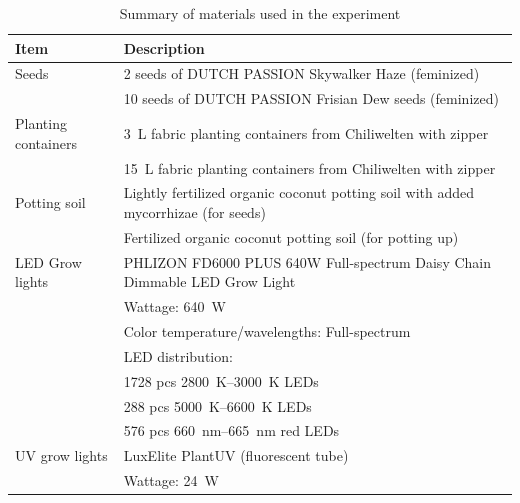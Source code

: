 \begin{table}[htbp]
    \caption{Summary of materials used in the experiment}
    \label{tab:materials}
    \begin{tabularx}{\linewidth}{l|X}
        \toprule
        \textbf{Item} & \textbf{Description} \\
        \midrule
        Seeds\index{seeds!cannabis} & 2 seeds of DUTCH PASSION Skywalker Haze\index{seeds!cannabis!Skywalker Haze} (feminized) \\
        & 10 seeds of DUTCH PASSION Frisian Dew seeds\index{seeds!cannabis!Frisian Dew} (feminized) \\
        \bigstrut
        Planting containers\index{planting container} & \qty[mode=text]{3}{\L} fabric planting containers from Chiliwelten with zipper \\
        & \qty[mode=text]{15}{\L} fabric planting containers from Chiliwelten with zipper \\
        \bigstrut
        Potting soil\index{potting soil} & Lightly fertilized organic coconut potting soil with added mycorrhizae\index{mycorrhizae} (for seeds) \\
        & Fertilized organic coconut potting soil (for potting up) \\
        \bigstrut
        LED Grow lights\index{grow light!LED} & PHLIZON FD6000 PLUS 640W Full-spectrum Daisy Chain Dimmable LED Grow Light\index{grow light!LED!PHLIZON FD6000 PLUS 640W Full-spectrum} \\
        & \quad Wattage: \qty[mode=text]{640}{\W} \\
        & \quad Color temperature/wavelengths: Full-spectrum \\
        & \quad LED distribution: \\
        & \quad \quad \num[mode=text]{1728} pcs \qtyrange[mode=text, range-phrase=\textendash, range-units=single]{2800}{3000}{\K} LEDs \\
        & \quad \quad \num[mode=text]{288} pcs \qtyrange[mode=text, range-phrase=\textendash, range-units=single]{5000}{6600}{\K} LEDs \\
        & \quad \quad \num[mode=text]{576} pcs \qtyrange[mode=text, range-phrase=\textendash, range-units=single]{660}{665}{\nm} red LEDs \\
        \bigstrut
        UV grow lights\index{grow light!UV} & LuxElite PlantUV (fluorescent tube)\index{grow light!UV!LuxElite PlantUV} \\
        & \quad Wattage: \qty[mode=text]{24}{\W} \\

\end{tabularx}
\end{table}
